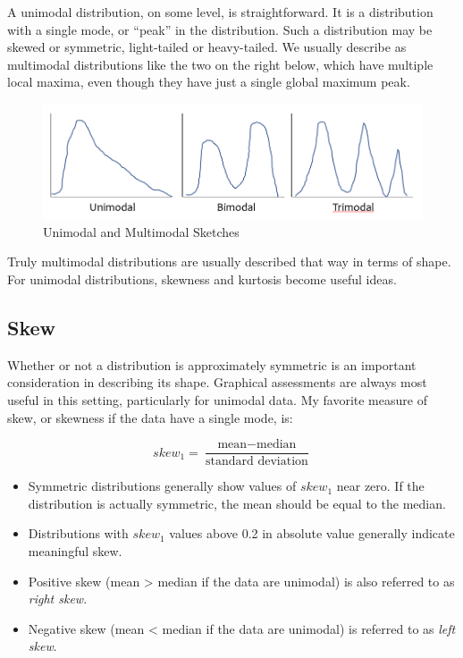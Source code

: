 \documentclass[
]{book}
\providecommand{\tightlist}{%
  \setlength{\itemsep}{0pt}\setlength{\parskip}{0pt}}
\begin{document}
A unimodal distribution, on some level, is straightforward. It is a distribution with a single mode, or ``peak'' in the distribution. Such a distribution may be skewed or symmetric, light-tailed or heavy-tailed. We usually describe as multimodal distributions like the two on the right below, which have multiple local maxima, even though they have just a single global maximum peak.

\begin{figure}
\includegraphics[width=0.9\linewidth]{figures/modality} \caption{Unimodal and Multimodal Sketches}\label{fig:modality-fig}
\end{figure}

Truly multimodal distributions are usually described that way in terms of shape. For unimodal distributions, skewness and kurtosis become useful ideas.

\hypertarget{skew}{%
\subsection{Skew}\label{skew}}

Whether or not a distribution is approximately symmetric is an important consideration in describing its shape. Graphical assessments are always most useful in this setting, particularly for unimodal data. My favorite measure of skew, or skewness if the data have a single mode, is:

\[
skew_1 = \frac{\mbox{mean} - \mbox{median}}{\mbox{standard deviation}}
\]

\begin{itemize}
\tightlist
\item
  Symmetric distributions generally show values of \(skew_1\) near zero. If the distribution is actually symmetric, the mean should be equal to the median.
\item
  Distributions with \(skew_1\) values above 0.2 in absolute value generally indicate meaningful skew.
\item
  Positive skew (mean \textgreater{} median if the data are unimodal) is also referred to as \emph{right skew}.
\item
  Negative skew (mean \textless{} median if the data are unimodal) is referred to as \emph{left skew}.
\end{itemize}
\end{document}
